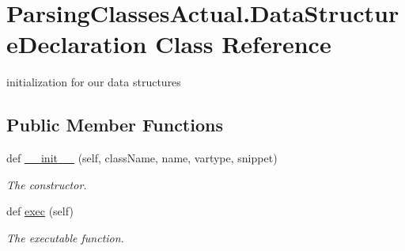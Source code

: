 \hypertarget{class_parsing_classes_actual_1_1_data_structure_declaration}{}\section{Parsing\+Classes\+Actual.\+Data\+Structure\+Declaration Class Reference}
\label{class_parsing_classes_actual_1_1_data_structure_declaration}


initialization for our data structures  


\subsection*{Public Member Functions}
\begin{DoxyCompactItemize}
\item 
def \hyperlink{class_parsing_classes_actual_1_1_data_structure_declaration_aa30264067a870240581f89487ee4834c}{\+\_\+\+\_\+init\+\_\+\+\_\+} (self, class\+Name, name, vartype, snippet)
\begin{DoxyCompactList}\small\item\em The constructor. \end{DoxyCompactList}\item 
\mbox{\label{class_parsing_classes_actual_1_1_data_structure_declaration_a69e6e4ab0c53bd579815a03bd333c88c}} 
def \hyperlink{class_parsing_classes_actual_1_1_data_structure_declaration_a69e6e4ab0c53bd579815a03bd333c88c}{exec} (self)
\begin{DoxyCompactList}\small\item\em The executable function. \end{DoxyCompactList}\end{DoxyCompactItemize}
